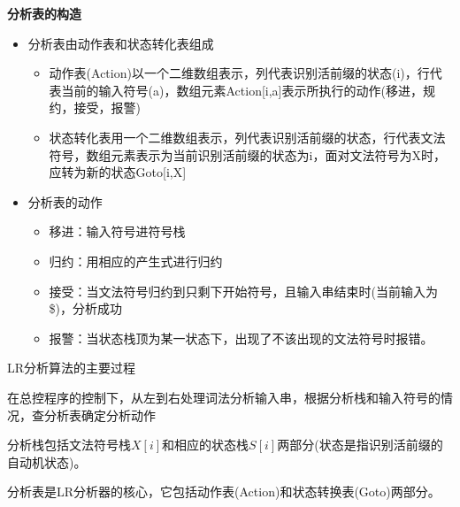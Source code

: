 \documentclass[utf8]{ctexart}
\begin{document}
\noindent\textbf{分析表的构造}
\begin{itemize}
    \item 分析表由动作表和状态转化表组成
    \begin{itemize}
        \item 动作表(Action)以一个二维数组表示，列代表识别活前缀的状态(i)，行代表当前的输入符号(a)，数组元素Action[i,a]表示所执行的动作(移进，规约，接受，报警)
        \item 状态转化表用一个二维数组表示，列代表识别活前缀的状态，行代表文法符号，数组元素表示为当前识别活前缀的状态为i，面对文法符号为X时，应转为新的状态Goto[i,X]
    \end{itemize}
    \item 分析表的动作
    \begin{itemize}
    \item 移进：输入符号进符号栈
    \item 归约：用相应的产生式进行归约
    \item 接受：当文法符号归约到只剩下开始符号，且输入串结束时(当前输入为\$)，分析成功
    \item 报警：当状态栈顶为某一状态下，出现了不该出现的文法符号时报错。
    \end{itemize}
\end{itemize}

LR分析算法的主要过程


\begin{center}
\end{center}

在总控程序的控制下，从左到右处理词法分析输入串，根据分析栈和输入符号的情况，查分析表确定分析动作

分析栈包括文法符号栈$X[i]$和相应的状态栈$S[i]$两部分(状态是指识别活前缀的自动机状态)。

分析表是LR分析器的核心，它包括动作表(Action)和状态转换表(Goto)两部分。
\end{document}
